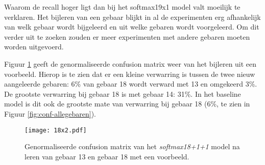 \npar Waarom de recall hoger ligt dan bij het softmax19x1 model valt moeilijk te verklaren. Het bijleren van een gebaar blijkt in al de experimenten erg afhankelijk van welk gebaar wordt bijgeleerd en uit welke gebaren wordt voorgeleerd. Om dit verder uit te zoeken zouden er meer experimenten met andere gebaren moeten worden uitgevoerd.

\npar Figuur \ref{fig:conf-18x2} geeft de genormaliseerde confusion matrix weer van het bijleren uit een voorbeeld. Hierop is te zien dat er een kleine verwarring is tussen de twee nieuw aangeleerde gebaren: 6\% van gebaar 18 wordt verward met 13 en omgekeerd 3\%. De grootste verwarring bij gebaar 18 is met gebaar 14: 31\%. In het baseline model is dit ook de grootste mate van verwarring bij gebaar 18 (6\%, te zien in Figuur \ref{fig:conf-allegebaren}).


\begin{figure}
	\centering
	\texttt{[image: 18x2.pdf]}
	\caption{Precision en recall na het bijleren van gebaar 13 en gebaar 18 in het \textit{softmax18+1+1} model. Ter vergelijking is het resultaat van het \textit{softmax19+1} model ook uitgetekend.}\label{fig:18x2}
	\vspace{1.5cm}
	\def\svgwidth{0.7\columnwidth}
	
	\caption{Genormaliseerde confusion matrix van het \textit{softmax18+1+1} model na leren van gebaar 13 en gebaar 18 met een voorbeeld.}\label{fig:conf-18x2}
\end{figure}